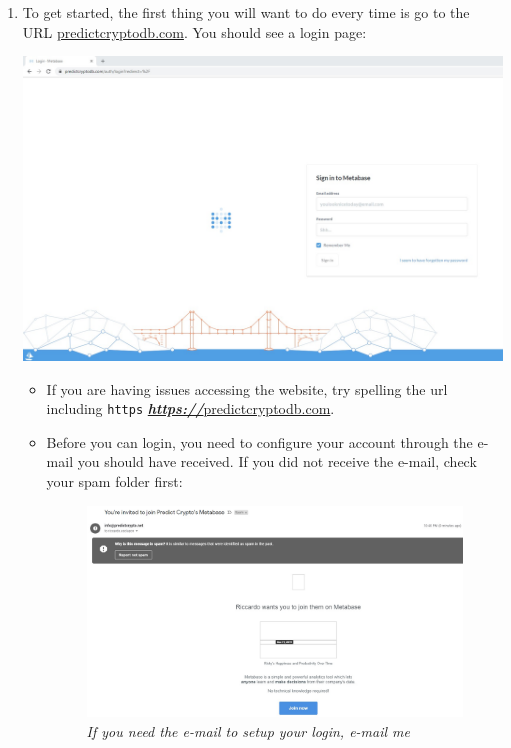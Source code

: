 \documentclass[
]{book}
\begin{document}
\begin{enumerate}
\def\labelenumi{\arabic{enumi}.}
\item
  To get started, the first thing you will want to do every time is go to the URL \href{https://predictcryptodb.com}{predictcryptodb.com}. You should see a login page:

  \includegraphics{images/MetabaseLogin.jpg}

  \begin{itemize}
  \item
    If you are having issues accessing the website, try spelling the url including \texttt{https} \href{https://predictcryptodb.com}{\textbf{\emph{https://}}predictcryptodb.com}.
  \item
    Before you can login, you need to configure your account through the e-mail you should have received. If you did not receive the e-mail, check your spam folder first:

    \begin{figure}
    \centering
    \includegraphics{images/MetabaseInvite.jpg}
    \caption{\emph{If you need the e-mail to setup your login, e-mail me}}
    \end{figure}


\end{itemize}
\end{enumerate}
\end{document}
